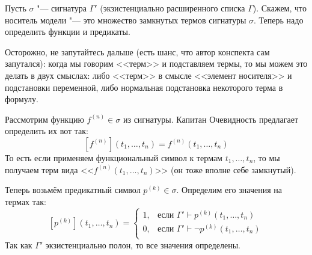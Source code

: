 
		Пусть $\sigma$ "--- сигнатура $\Gamma'$ (экзистенциально расширенного списка $\Gamma$).
		Скажем, что носитель модели "--- это множество замкнутых термов сигнатуры $\sigma$.
		Теперь надо определить функции и предикаты.
		\begin{Rem}
			Осторожно, не запутайтесь дальше (есть шанс, что автор конспекта сам запутался):
			когда мы говорим <<терм>> и подставляем термы, то мы можем это делать в двух смыслах:
			либо <<терм>> в смысле <<элемент носителя>> и подстановки переменной, либо
			нормальная подстановка некоторого терма в формулу.
		\end{Rem}

		Рассмотрим функцию $f^{(n)} \in \sigma$ из сигнатуры.
		Капитан Очевидность предлагает определить их вот так:
		\[ [f^{(n)}](t_1, \dots, t_n) = f^{(n)}(t_1, \dots, t_n) \]
		То есть если применяем функциональный символ к термам $t_1, \dots, t_n$,
		то мы получаем терм вида <<$f^{(n)}(t_1, \dots, t_n)$>> (он тоже вполне себе замкнутый).

		Теперь возьмём предикатный символ $p^{(k)} \in \sigma$.
		Определим его значения на термах так:
		\[
			[p^{(k)}](t_1, \dots, t_n) =
			\begin{cases}
				1, &\text{если } \Gamma' \vdash p^{(k)}(t_1, \dots, t_n) \\
				0, &\text{если } \Gamma' \vdash \lnot p^{(k)}(t_1, \dots, t_n) \\
			\end{cases}
		\]
		Так как $\Gamma'$ экзистенциально полон, то все значения определены.

